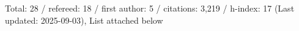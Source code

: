 Total: 28 / refereed: 18 / first author: 5 / citations: 3,219 / h-index: 17 (Last updated: 2025-09-03), List attached below